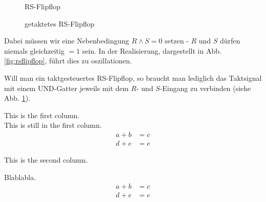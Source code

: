 \documentclass[12pt, a4paper, twopage]{scrartcl}
\begin{document}
\begin{figure}[h!]
\centering
		\centering
		\caption{RS-Flipflop}%
		\label{fig:rsflipflop}
	\endminipage\hspace{1cm}   
%
		\centering
		\caption{getaktetes RS-Flipflop}%
		\label{fig:rsflipfloptakt}
	\endminipage
\end{figure}


Dabei müssen wir eine Nebenbedingung $R \wedge S = 0$ setzen - $R$ und $S$ dürfen niemals gleichzeitig $= 1$ sein. In der Realisierung, dargestellt in Abb. \ref{fig:rsflipflop}, führt dies zu oszillationen. 

Will man ein taktgesteuertes RS-Flipflop, so braucht man lediglich das Taktsignal mit einem UND-Gatter jeweils mit dem $R$- und $S$-Eingang zu verbinden (siehe Abb. \ref{fig:rsflipfloptakt}).\\



\begin{minipage}[t]{0.5\textwidth}
	This is the first column.\\
	
	This is still in the first column.
	\begin{align}
		a+b &= c\\
		d+e &= e
	\end{align}
\end{minipage}
%
%
\begin{minipage}[t]{0.5\textwidth}
	This is the second column.
	
	Blablabla.
	\begin{align*}
		a+b &= c\\
		d+e &= e
	\end{align*}
\end{minipage}
\end{document}
